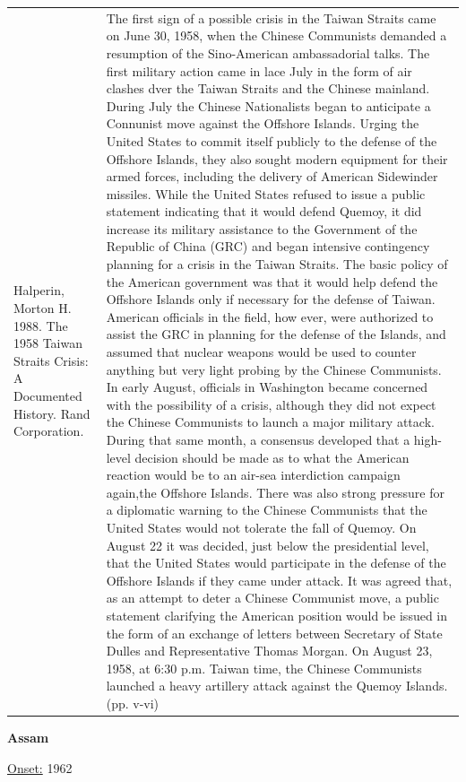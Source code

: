 {\begin{longtable}{p{}p{}}
Halperin, Morton H. 1988. The 1958 Taiwan Straits Crisis: A Documented History. Rand Corporation. & The first sign of a possible crisis in the Taiwan Straits came on June 30, 1958, when the Chinese Communists demanded a resumption of the Sino-American ambassadorial talks. The first military action came in lace July in the form of air clashes dver the Taiwan Straits and the Chinese mainland. During July the Chinese Nationalists began to anticipate a Connunist move against the Offshore Islands. Urging the United States to commit itself publicly to the defense of the Offshore Islands, they also sought modern equipment for their armed forces, including the delivery of American Sidewinder missiles. While the United States refused to issue a public statement indicating that it would defend Quemoy, it did increase its military assistance to the Government of the Republic of China (GRC) and began intensive contingency planning for a crisis in the Taiwan Straits. The basic policy of the American government was that it would help defend the Offshore Islands only if necessary for the defense of Taiwan. American officials in the field, how ever, were authorized to assist the GRC in planning for the defense of the Islands, and assumed that nuclear weapons would be used to counter anything but very light probing by the Chinese Communists. In early August, officials in Washington became concerned with the possibility of a crisis, although they did not expect the Chinese Communists to launch a major military attack. During that same month, a consensus developed that a high-level decision should be made as to what the American reaction would be to an air-sea interdiction campaign again,the Offshore Islands. There was also strong pressure for a diplomatic warning to the Chinese Communists that the United States would not tolerate the fall of Quemoy. On August 22 it was decided, just below the presidential level, that the United States would participate in the defense of the Offshore Islands if they came under attack. It was agreed that, as an attempt to deter a Chinese Communist move, a public statement clarifying the American position would be issued in the form of an exchange of letters between Secretary of State Dulles and Representative Thomas Morgan. On August 23, 1958, at 6:30 p.m. Taiwan time, the Chinese Communists launched a heavy artillery attack against the Quemoy Islands. (pp. v-vi)
\\
\end{longtable}}
\clearpage
         \textbf{Assam} 

          \underline{Onset:} 1962         

